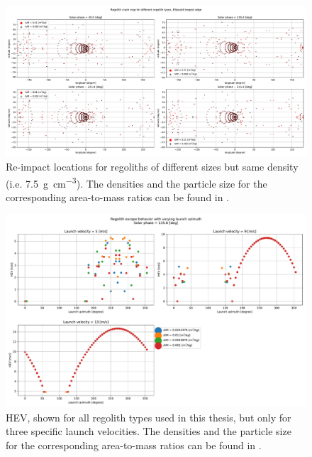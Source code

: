 \documentclass[print]{tudelft-report}
\begin{document}
\begin{appendices}
    \begin{figure}[htb]
    \centering
    \captionsetup{justification=centering}
    \includegraphics[angle=90, width=\textwidth, height=\textheight, keepaspectratio=true]{Results/Images/longest_edge_perturbations/multiple_regolith_types/allPhases_crashMap_7P5_density_1cm_5cm_Radius.pdf}
    \caption{Re-impact locations for regoliths of different sizes but same density (i.e. \SI{7.5}{\gram\per\centi\metre\cubed}). The densities and the particle size for the corresponding area-to-mass ratios can be found in .}
    \label{fig:crashmap_7.5_density_1cm_5cmRadius}
    \end{figure}
    \FloatBarrier
    \begin{figure}[htb]
    \centering
    \captionsetup{justification=centering}
    \includegraphics[width=\textwidth, height=0.5\textheight, keepaspectratio=true]{Results/Images/longest_edge_perturbations/multiple_regolith_types/phase135_escapeHEV.pdf}
    \caption{\gls{HEV}, shown for all regolith types used in this thesis, but only for three specific launch velocities. The densities and the particle size for the corresponding area-to-mass ratios can be found in .}

\end{figure}
\end{appendices}
\end{document}
